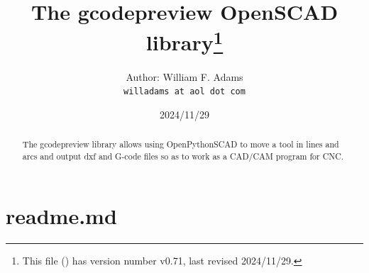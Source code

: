 \documentclass{ltxdoc}
\begin{document}

\def\fileversion{v0.71} \def\filedate{2024/11/29}








\title{The gcodepreview OpenSCAD library\thanks{This
        file (\texttt{\jobname}) has version number \fileversion, last revised
        \filedate.}}

\author{%
Author: William F. Adams\\
\texttt{willadams at aol dot com}
}
\date{\filedate}
\maketitle
\begin{abstract}
\noindent The gcodepreview library allows using OpenPythonSCAD to move a tool in lines 
and arcs and output dxf and G-code files so as to work as a CAD/\allowbreak CAM program 
for CNC.
\end{abstract}
\tableofcontents

\clearpage
\section{readme.md}
\end{document}
